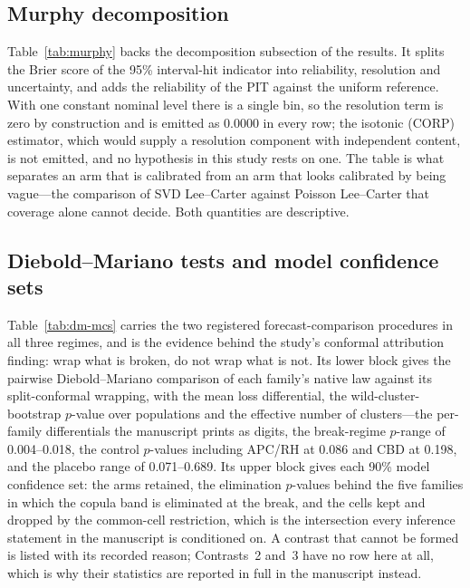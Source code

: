 \subsection{Murphy decomposition}

Table~\ref{tab:murphy} backs the decomposition subsection of the results. It
splits the Brier score of the 95\% interval-hit indicator into reliability,
resolution and uncertainty, and adds the reliability of the PIT against the
uniform reference. With one constant nominal level there is a single bin, so
the resolution term is zero by construction and is emitted as 0.0000 in every
row; the isotonic (CORP) estimator, which would supply a resolution component
with independent content, is not emitted, and no hypothesis in this study rests
on one. The table is what separates an arm that is calibrated from an arm that
looks calibrated by being vague---the comparison of SVD Lee--Carter against
Poisson Lee--Carter that coverage alone cannot decide. Both quantities are
descriptive.


\subsection{Diebold--Mariano tests and model confidence sets}

Table~\ref{tab:dm-mcs} carries the two registered forecast-comparison
procedures in all three regimes, and is the evidence behind the study's
conformal attribution finding: wrap what is broken, do not wrap what is not.
Its lower block gives the pairwise Diebold--Mariano comparison of each family's
native law against its split-conformal wrapping, with the mean loss
differential, the wild-cluster-bootstrap $p$-value over populations and the
effective number of clusters---the per-family differentials the manuscript
prints as digits, the break-regime $p$-range of 0.004--0.018, the control
$p$-values including APC/RH at 0.086 and CBD at 0.198, and the placebo range of
0.071--0.689. Its upper block gives each 90\% model confidence set: the arms
retained, the elimination $p$-values behind the five families in which the
copula band is eliminated at the break, and the cells kept and dropped by the
common-cell restriction, which is the intersection every inference statement in
the manuscript is conditioned on. A contrast that cannot be formed is listed
with its recorded reason; Contrasts~2 and~3 have no row here at all, which is
why their statistics are reported in full in the manuscript instead.

